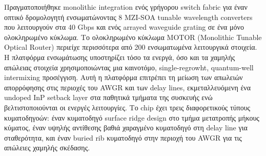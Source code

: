 Πραγματοποιήθηκε monolithic integration ενός γρήγορου switch fabric
για έναν οπτικό δρομολογητή ενσωματώνοντας 8 MZI-SOA tunable
wavelength converters που λειτουργούν στα 40 Gbps και ενός arrayed
waveguide grating σε ένα μόνο ολοκληρωμένο κύκλωμα. \cite{5515982} Το
ολοκληρωμένο κύκλωμα MOTOR (Monolithic Tunable Optical Router)
περιείχε περισσότερα από 200 ενσωματωμένα λειτουργικά στοιχεία. Η
πλατφόρμα ενσωμάτωσης υποστηρίζει τόσο τα ενεργά, όσο και τα χαμηλής
απώλειας στοιχεία χρησιμοποιώντας μια καινοτόμο, single-regrowht,
quantum-well intermixing προσέγγιση. Αυτή η πλατφόρμα επιτρέπει τη
μείωση των απωλειών απορρόφησης στις περιοχές του AWGR και των delay
lines, εκμεταλλευόμενη ένα undoped InP setback layer στα παθητικά
τμήματα της συσκευής ενώ βελτιστοποιούνται οι ενεργές λειτουργίες.  Το
chip έχει τρεις διαφορετικούς τύπους κυματοδηγοών: έναν κυματοδηγό
surface ridge design στο τμήμα μετατροπής μήκους κύματος, έναν υψηλής
αντίθεσης βαθιά χαραγμένο κυματοδηγό στη delay line για σταθερότητα,
και έναν buried rib κυματοδηγό στην περιοχή του AWGR για τις απώλειες
χαμηλής σκέδασης.

